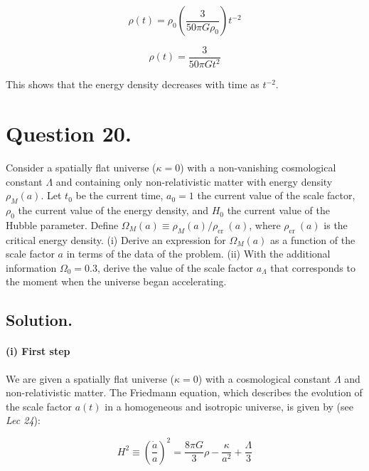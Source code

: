 \documentclass{article}
\begin{document}
\begin{equation}
\rho(t) = \rho_0 \left(\frac{3}{50\pi G \rho_0}\right) t^{-2}
\end{equation}

\begin{equation}
\rho(t) = \frac{3}{50\pi G t^2}
\end{equation}

This shows that the energy density decreases with time as $t^{-2}$.


\pagebreak

\section*{Question 20.} Consider a spatially flat universe ($\kappa=0$) with a non-vanishing cosmological constant $\Lambda$ and containing only non-relativistic matter with energy density $\rho_{M}(a)$. Let $t_{0}$ be the current time, $a_{0}=1$ the current value of the scale factor, $\rho_{0}$ the current value of the energy density, and $H_{0}$ the current value of the Hubble parameter. Define $\Omega_{M}(a) \equiv \rho_{M}(a) / \rho_{\text {cr }}(a)$, where $\rho_{\text {cr }}(a)$ is the critical energy density. (i) Derive an expression for $\Omega_{M}(a)$ as a function of the scale factor $a$ in terms of the data of the problem. (ii) With the additional information $\Omega_{0}=0.3$, derive the value of the scale factor $a_{\Lambda}$ that corresponds to the moment when the universe began accelerating.

\bigskip

\subsection*{Solution.}

\paragraph{(i) First step}
We are given a spatially flat universe ($\kappa = 0$) with a cosmological constant $\Lambda$ and non-relativistic matter. The Friedmann equation, which describes the evolution of the scale factor $a(t)$ in a homogeneous and isotropic universe, is given by (see \emph{Lec 24}):

\begin{equation}
\label{eq:friedmann}
H^{2} \equiv \left( \frac{\dot{a}}{a} \right)^{2} = \frac{8\pi G}{3}\rho - \frac{\kappa }{a^{2}} + \frac{\Lambda }{3}
\end{equation}
\end{document}
